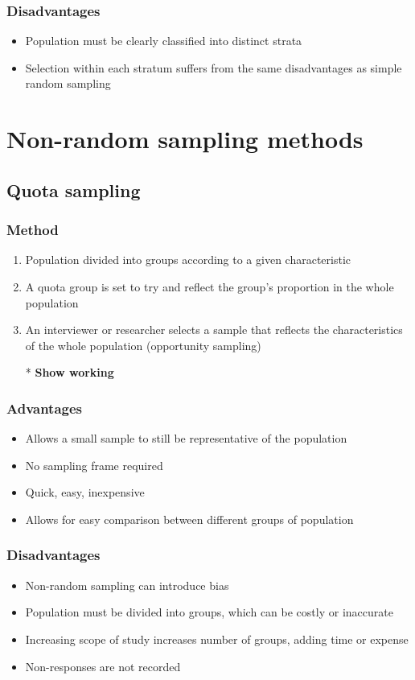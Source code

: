 \subsubsection{Disadvantages}
\begin{itemize}
    \item Population must be clearly classified into distinct strata
    \item Selection within each stratum suffers from the same disadvantages as simple random sampling
\end{itemize}
\section{Non-random sampling methods}
\subsection{Quota sampling}
\subsubsection{Method}
\begin{enumerate}
    \item Population divided into groups according to a given characteristic
    \item A quota group is set to try and reflect the group's proportion in the whole population
    \item An interviewer or researcher selects a sample that reflects the characteristics of the whole population (opportunity sampling)
    \item[*] \textbf{Show working}
\end{enumerate}
\subsubsection{Advantages}
\begin{itemize}
    \item Allows a small sample to still be representative of the population
    \item No sampling frame required
    \item Quick, easy, inexpensive
    \item Allows for easy comparison between different groups of population
\end{itemize}
\subsubsection{Disadvantages}
\begin{itemize}
    \item Non-random sampling can introduce bias
    \item Population must be divided into groups, which can be costly or inaccurate
    \item Increasing scope of study increases number of groups, adding time or expense
    \item Non-responses are not recorded
\end{itemize}

